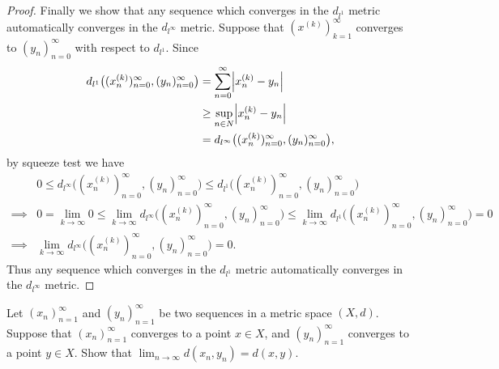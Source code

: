 \begin{proof}
  Finally we show that any sequence which converges in the \(d_{l^1}\) metric automatically converges in the \(d_{l^\infty}\) metric.
  Suppose that \((x^{(k)})_{k = 1}^\infty\) converges to \((y_n)_{n = 0}^\infty\) with respect to \(d_{l^1}\).
  Since
  \begin{align*}
    d_{l^1}\big((x_n^{(k)})_{n = 0}^\infty, (y_n)_{n = 0}^\infty\big) & = \sum_{n = 0}^\infty \abs{x_n^{(k)} - y_n}                               \\
                                                                      & \geq \sup_{n \in N} \abs{x_n^{(k)} - y_n}                                 \\
                                                                      & = d_{l^\infty}\big((x_n^{(k)})_{n = 0}^\infty, (y_n)_{n = 0}^\infty\big),
  \end{align*}
  by squeeze test we have
  \begin{align*}
             & 0 \leq d_{l^\infty}\big((x_n^{(k)})_{n = 0}^\infty, (y_n)_{n = 0}^\infty\big) \leq d_{l^1}\big((x_n^{(k)})_{n = 0}^\infty, (y_n)_{n = 0}^\infty\big)                                                                     \\
    \implies & 0 = \lim_{k \to \infty} 0 \leq \lim_{k \to \infty} d_{l^\infty}\big((x_n^{(k)})_{n = 0}^\infty, (y_n)_{n = 0}^\infty\big) \leq \lim_{k \to \infty} d_{l^1}\big((x_n^{(k)})_{n = 0}^\infty, (y_n)_{n = 0}^\infty\big) = 0 \\
    \implies & \lim_{k \to \infty} d_{l^\infty}\big((x_n^{(k)})_{n = 0}^\infty, (y_n)_{n = 0}^\infty\big) = 0.
  \end{align*}
  Thus any sequence which converges in the \(d_{l^1}\) metric automatically converges in the \(d_{l^\infty}\) metric.
\end{proof}

\begin{ex}\label{ex:1.1.16}
  Let \((x_n)_{n = 1}^\infty\) and \((y_n)_{n = 1}^\infty\) be two sequences in a metric space \((X, d)\).
  Suppose that \((x_n)_{n = 1}^\infty\) converges to a point \(x \in X\), and \((y_n)_{n = 1}^\infty\) converges to a point \(y \in X\).
  Show that \(\lim_{n \to \infty} d(x_n, y_n) = d(x, y)\).
\end{ex}

